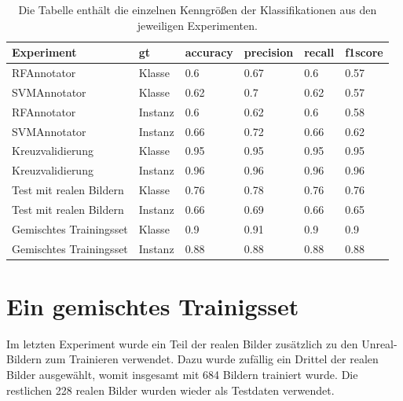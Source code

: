 \begin{table}
\centering
{}
\begin{tabularx}{\textwidth}{Xlllll}
\textbf{Experiment}	&	\textbf{\gls{gt}}	& \textbf{\gls{accuracy}} & \textbf{\gls{precision}}	& \textbf{\gls{recall}}	& \textbf{\gls{f1score}} \\ \hline
RFAnnotator				&Klasse		&0.6	&0.67	&0.6	&0.57	\\
SVMAnnotator			&Klasse		&0.62	&0.7	&0.62	&0.57	\\
RFAnnotator				&Instanz	&0.6	&0.62	&0.6	&0.58	\\
SVMAnnotator			&Instanz	&0.66	&0.72	&0.66	&0.62	\\ \hline
Kreuzvalidierung		&Klasse		&0.95	&0.95	&0.95	&0.95	\\
Kreuzvalidierung		&Instanz	&0.96	&0.96	&0.96	&0.96	\\ \hline
Test mit realen Bildern	&Klasse		&0.76	&0.78	&0.76	&0.76	\\
Test mit realen Bildern	&Instanz	&0.66	&0.69	&0.66	&0.65	\\ \hline
Gemischtes Trainingsset	&Klasse		&0.9	&0.91	&0.9	&0.9	\\
Gemischtes Trainingsset	&Instanz	&0.88	&0.88	&0.88	&0.88	\\
\end{tabularx}
\caption[Übersicht der Kenngrößen der einzelnen Experimente]{Die Tabelle enthält die einzelnen Kenngrößen der Klassifikationen aus den jeweiligen Experimenten.}
\label{tab:classification_all}
\end{table}


\section{Ein gemischtes Trainigsset}
\label{unrealrealmixed}

Im letzten Experiment wurde ein Teil der realen Bilder zusätzlich zu den Unreal-Bildern zum Trainieren verwendet. Dazu wurde zufällig ein Drittel der realen Bilder ausgewählt, womit insgesamt mit 684 Bildern trainiert wurde. Die restlichen 228 realen Bilder wurden wieder als Testdaten verwendet. \par

